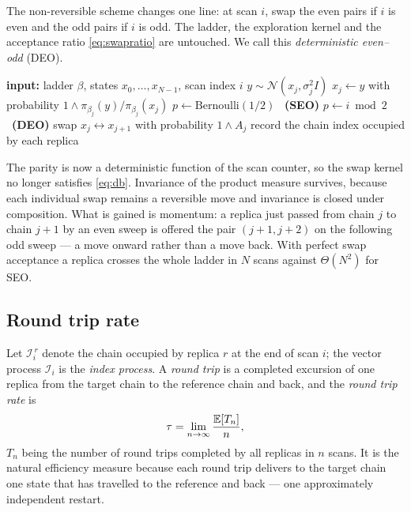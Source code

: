 The non-reversible scheme changes one line: at scan $i$, swap the even pairs if
$i$ is even and the odd pairs if $i$ is odd. The ladder, the exploration kernel
and the acceptance ratio \eqref{eq:swapratio} are untouched. We call this
\emph{deterministic even--odd} (DEO).

\begin{algorithm}[h]
\caption{One parallel tempering scan. SEO and DEO differ only in line~6.}
\label{alg:pt}
\begin{algorithmic}[1]
  \State \textbf{input:} ladder $\beta$, states $x_0,\dots,x_{N-1}$, scan index $i$
      \State $y\sim\mathcal N(x_j,\sigma_j^2 I)$
      \State $x_j\leftarrow y$ with probability
             $1\wedge\pi_{\beta_j}(y)/\pi_{\beta_j}(x_j)$
    \EndFor
  \EndFor
  \State $p\leftarrow\mathrm{Bernoulli}(1/2)$ \ \textbf{(SEO)}
         \qquad $p\leftarrow i\bmod 2$ \ \textbf{(DEO)}
    \State swap $x_j\leftrightarrow x_{j+1}$ with probability $1\wedge A_j$
  \EndFor
  \State record the chain index occupied by each replica
\end{algorithmic}
\end{algorithm}

The parity is now a deterministic function of the scan counter, so the swap
kernel no longer satisfies \eqref{eq:db}. Invariance of the product measure
survives, because each individual swap remains a reversible move and invariance
is closed under composition. What is gained is momentum: a replica just passed
from chain $j$ to chain $j+1$ by an even sweep is offered the pair $(j+1,j+2)$ on
the following odd sweep --- a move onward rather than a move back. With perfect
swap acceptance a replica crosses the whole ladder in $N$ scans against
$\Theta(N^2)$ for SEO.

\subsection{Round trip rate}

Let $\mathcal I_i^{\,r}$ denote the chain occupied by replica $r$ at the end of
scan $i$; the vector process $\mathcal I_i$ is the \emph{index process}. A
\emph{round trip} is a completed excursion of one replica from the target chain
to the reference chain and back, and the \emph{round trip rate} is
\begin{equation}
  \tau=\lim_{n\to\infty}\frac{\mathbb{E}[T_n]}{n},
  \label{eq:tau}
\end{equation}
$T_n$ being the number of round trips completed by all replicas in $n$ scans.
It is the natural efficiency measure because each round trip delivers to the
target chain one state that has travelled to the reference and back --- one
approximately independent restart.

